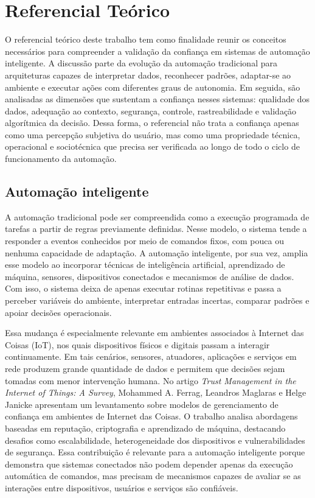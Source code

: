 \documentclass[12pt]{article}
\begin{document}
\section{Referencial Teórico}

O referencial teórico deste trabalho tem como finalidade reunir os conceitos necessários para compreender a validação da confiança em sistemas de automação inteligente. A discussão parte da evolução da automação tradicional para arquiteturas capazes de interpretar dados, reconhecer padrões, adaptar-se ao ambiente e executar ações com diferentes graus de autonomia. Em seguida, são analisadas as dimensões que sustentam a confiança nesses sistemas: qualidade dos dados, adequação ao contexto, segurança, controle, rastreabilidade e validação algorítmica da decisão. Dessa forma, o referencial não trata a confiança apenas como uma percepção subjetiva do usuário, mas como uma propriedade técnica, operacional e sociotécnica que precisa ser verificada ao longo de todo o ciclo de funcionamento da automação.

\subsection{Automação inteligente}

A automação tradicional pode ser compreendida como a execução programada de tarefas a partir de regras previamente definidas. Nesse modelo, o sistema tende a responder a eventos conhecidos por meio de comandos fixos, com pouca ou nenhuma capacidade de adaptação. A automação inteligente, por sua vez, amplia esse modelo ao incorporar técnicas de inteligência artificial, aprendizado de máquina, sensores, dispositivos conectados e mecanismos de análise de dados. Com isso, o sistema deixa de apenas executar rotinas repetitivas e passa a perceber variáveis do ambiente, interpretar entradas incertas, comparar padrões e apoiar decisões operacionais.

Essa mudança é especialmente relevante em ambientes associados à Internet das Coisas (IoT), nos quais dispositivos físicos e digitais passam a interagir continuamente. Em tais cenários, sensores, atuadores, aplicações e serviços em rede produzem grande quantidade de dados e permitem que decisões sejam tomadas com menor intervenção humana. No artigo \textit{Trust Management in the Internet of Things: A Survey}, Mohammed A. Ferrag, Leandros Maglaras e Helge Janicke \cite{ferrag2019} apresentam um levantamento sobre modelos de gerenciamento de confiança em ambientes de Internet das Coisas. O trabalho analisa abordagens baseadas em reputação, criptografia e aprendizado de máquina, destacando desafios como escalabilidade, heterogeneidade dos dispositivos e vulnerabilidades de segurança. Essa contribuição é relevante para a automação inteligente porque demonstra que sistemas conectados não podem depender apenas da execução automática de comandos, mas precisam de mecanismos capazes de avaliar se as interações entre dispositivos, usuários e serviços são confiáveis.
\end{document}
